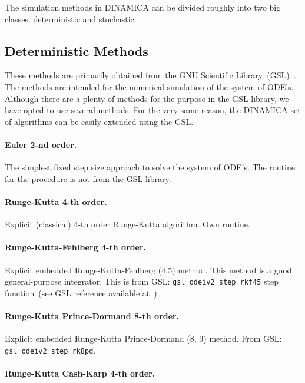 \documentclass[11pt,a4paper]{article}
\begin{document}
The simulation methods in DINAMICA can be divided roughly into two big classes:
deterministic and stochastic.

\subsection{Deterministic Methods}
\label{sec:determ-meth}

These methods are primarily obtained from the GNU Scientific
Library~(GSL)~\cite{GSLLink}. The methods are intended for the numerical simulation
of the system of ODE's. Although there are a plenty of methods for the purpose in the
GSL library, we have opted to use several methods. For the very same reason, the
DINAMICA set of algorithms can be easily extended using the GSL.

\paragraph{Euler 2-nd order.}
\label{sec:euler-2-nd}

The simplest fixed step size approach to solve the system of ODE's. The routine for
the procedure is not from the GSL library.

\paragraph{Runge-Kutta 4-th order.}
\label{sec:runge-kutta-4}

Explicit (classical) 4-th order Runge-Kutta algorithm. Own routine.

\paragraph{Runge-Kutta-Fehlberg 4-th order.}
\label{sec:run-kut-feglberg}

Explicit embedded Runge-Kutta-Fehlberg (4,5) method. This method is a good
general-purpose integrator. This is from GSL: \texttt{gsl\_odeiv2\_step\_rkf45} step
function~(see GSL reference available at~\cite{GSLLink}).

\paragraph{Runge-Kutta Prince-Dormand 8-th order.}
\label{sec:runge-kutta-prince}

Explicit embedded Runge-Kutta Prince-Dormand (8, 9) method. From GSL:
\texttt{gsl\_odeiv2\_step\_rk8pd}.

\paragraph{Runge-Kutta Cash-Karp 4-th order.}
\label{sec:runge-kutta-cash}
\end{document}

